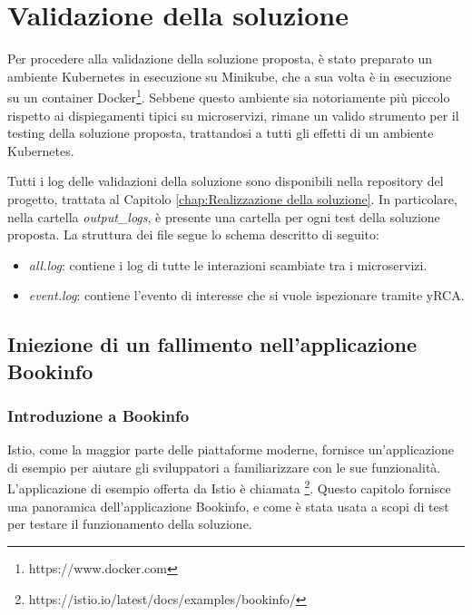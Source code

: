\chapter{Validazione della soluzione}\label{chap:Validazione della soluzione}
Per procedere alla validazione della soluzione proposta, è stato preparato un ambiente Kubernetes in esecuzione su Minikube, che a sua volta è in esecuzione su un container Docker\footnote{https://www.docker.com}. Sebbene questo ambiente sia notoriamente più piccolo rispetto ai dispiegamenti tipici su microservizi, rimane un valido strumento per il testing della soluzione proposta, trattandosi a tutti gli effetti di un ambiente Kubernetes.

Tutti i log delle validazioni della soluzione sono disponibili nella repository del progetto, trattata al Capitolo \ref{chap:Realizzazione della soluzione}. In particolare, nella cartella \textit{output\_logs}, è presente una cartella per ogni test della soluzione proposta. La struttura dei file segue lo schema descritto di seguito:
\begin{itemize}
    \item \textit{all.log}: contiene i log di tutte le interazioni scambiate tra i microservizi.
    \item \textit{event.log}: contiene l'evento di interesse che si vuole ispezionare tramite yRCA.
\end{itemize}
\section{Iniezione di un fallimento nell'applicazione Bookinfo} \label{sect:Iniezione di un fallimento nell'applicazione Bookinfo}
\subsection{Introduzione a Bookinfo}
Istio, come la maggior parte delle piattaforme moderne, fornisce un'applicazione di esempio per aiutare gli sviluppatori a familiarizzare con le sue funzionalità. L'applicazione di esempio offerta da Istio è chiamata \footnote{https://istio.io/latest/docs/examples/bookinfo/}. Questo capitolo fornisce una panoramica dell'applicazione Bookinfo, e come è stata usata a scopi di test per testare il funzionamento della soluzione.

